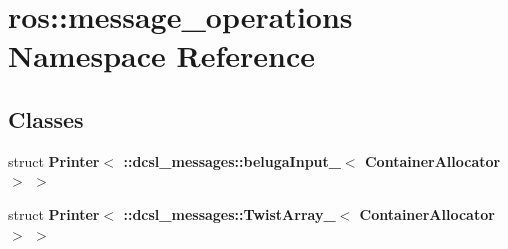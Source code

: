 \section{ros\-:\-:message\-\_\-operations \-Namespace \-Reference}
\label{namespaceros_1_1message__operations}
\subsection*{\-Classes}
\begin{DoxyCompactItemize}
\item 
struct {\bf \-Printer$<$ \-::dcsl\-\_\-messages\-::beluga\-Input\-\_\-$<$ Container\-Allocator $>$ $>$}
\item 
struct {\bf \-Printer$<$ \-::dcsl\-\_\-messages\-::\-Twist\-Array\-\_\-$<$ Container\-Allocator $>$ $>$}
\end{DoxyCompactItemize}
